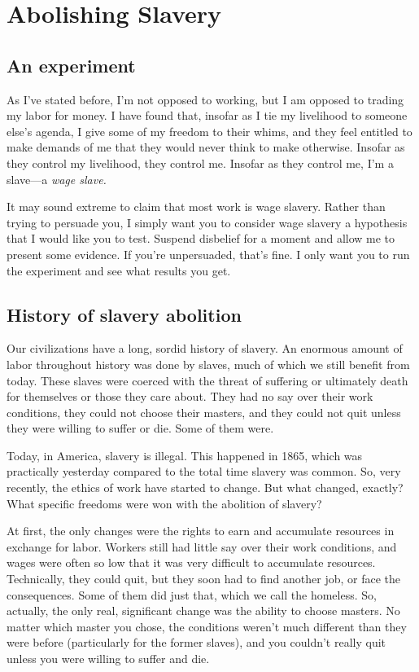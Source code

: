 \chapter{Abolishing Slavery}

\section{An experiment}
As I've stated before, I'm not opposed to working, but I am opposed to trading my labor for money. I have found that, insofar as I tie my livelihood to someone else's agenda, I give some of my freedom to their whims, and they feel entitled to make demands of me that they would never think to make otherwise. Insofar as they control my livelihood, they control me. Insofar as they control me, I'm a slave---a \emph{wage slave.}

It may sound extreme to claim that most work is wage slavery. Rather than trying to persuade you, I simply want you to consider wage slavery a hypothesis that I would like you to test. Suspend disbelief for a moment and allow me to present some evidence. If you're unpersuaded, that's fine. I only want you to run the experiment and see what results you get.

\section{History of slavery abolition}
Our civilizations have a long, sordid history of slavery. An enormous amount of labor throughout history was done by slaves, much of which we still benefit from today. These slaves were coerced with the threat of suffering or ultimately death for themselves or those they care about. They had no say over their work conditions, they could not choose their masters, and they could not quit unless they were willing to suffer or die. Some of them were.

Today, in America, slavery is illegal. This happened in 1865, which was practically yesterday compared to the total time slavery was common. So, very recently, the ethics of work have started to change. But what changed, exactly? What specific freedoms were won with the abolition of slavery?

At first, the only changes were the rights to earn and accumulate resources in exchange for labor. Workers still had little say over their work conditions, and wages were often so low that it was very difficult to accumulate resources. Technically, they could quit, but they soon had to find another job, or face the consequences. Some of them did just that, which we call the homeless. So, actually, the only real, significant change was the ability to choose masters. No matter which master you chose, the conditions weren't much different than they were before (particularly for the former slaves), and you couldn't really quit unless you were willing to suffer and die.

